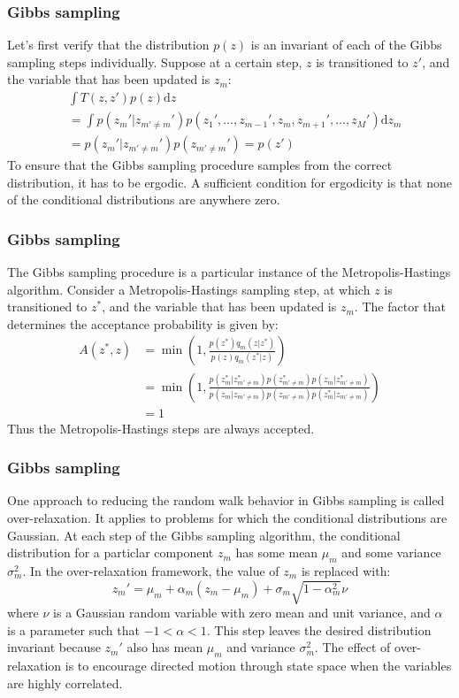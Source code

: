 \documentclass{beamer}
\begin{document}
\begin{frame}
    \frametitle{Gibbs sampling}
    Let's first verify that the distribution $p(z)$ is an invariant of each of the Gibbs sampling steps individually. Suppose at a certain step, $z$ is transitioned to $z'$, and the variable that has been updated is $z_{m}$:
    \begin{align*}
        &\int{}T(z,z')p(z)\mathrm{d}z \\
        &=\int{}p(z_{m}'|z_{m'\ne{}m}')p(z_{1}',\hdots,z_{m-1}',z_{m},z_{m+1}',\hdots,z_{M}')\mathrm{d}z_{m} \\
        &=p(z_{m}'|z_{m'\ne{}m}')p(z_{m'\ne{}m}')=p(z')
    \end{align*}
    To ensure that the Gibbs sampling procedure samples from the correct distribution, it has to be ergodic. A sufficient condition for ergodicity is that none of the conditional distributions are anywhere zero.
\end{frame}

\begin{frame}
    \frametitle{Gibbs sampling}
    The Gibbs sampling procedure is a particular instance of the Metropolis-Hastings algorithm. Consider a Metropolis-Hastings sampling step, at which $z$ is transitioned to $z^{*}$, and the variable that has been updated is $z_{m}$. The factor that determines the acceptance probability is given by:
    \begin{align*}
        A(z^{*},z)&=\min(1,\frac{p(z^{*})q_{m}(z|z^{*})}{p(z)q_{m}(z^{*}|z)}) \\
        &=\min(1,\frac{p(z^{*}_{m}|z^{*}_{m'\ne{}m})p(z^{*}_{m'\ne{}m})p(z_{m}|z^{*}_{m'\ne{}m})}{p(z_{m}|z_{m'\ne{}m})p(z_{m'\ne{}m})p(z^{*}_{m}|z_{m'\ne{}m})}) \\
        &=1
    \end{align*}
    Thus the Metropolis-Hastings steps are always accepted.
\end{frame}

\begin{frame}
    \frametitle{Gibbs sampling}
    One approach to reducing the random walk behavior in Gibbs sampling is called over-relaxation. It applies to problems for which the conditional distributions are Gaussian. At each step of the Gibbs sampling algorithm, the conditional distribution for a particlar component $z_{m}$ has some mean $\mu_{m}$ and some variance $\sigma^{2}_{m}$. In the over-relaxation framework, the value of $z_{m}$ is replaced with:
    \begin{equation*}
        z_{m}'=\mu_{m}+\alpha_{m}(z_{m}-\mu_{m})+\sigma_{m}\sqrt{1-\alpha_{m}^{2}}\nu
    \end{equation*}
    where $\nu$ is a Gaussian random variable with zero mean and unit variance, and $\alpha$ is a parameter such that $-1<\alpha<1$. This step leaves the desired distribution invariant because $z_{m}'$ also has mean $\mu_{m}$ and variance $\sigma^{2}_{m}$. The effect of over-relaxation is to encourage directed motion through state space when the variables are highly correlated.
\end{frame}
\end{document}
